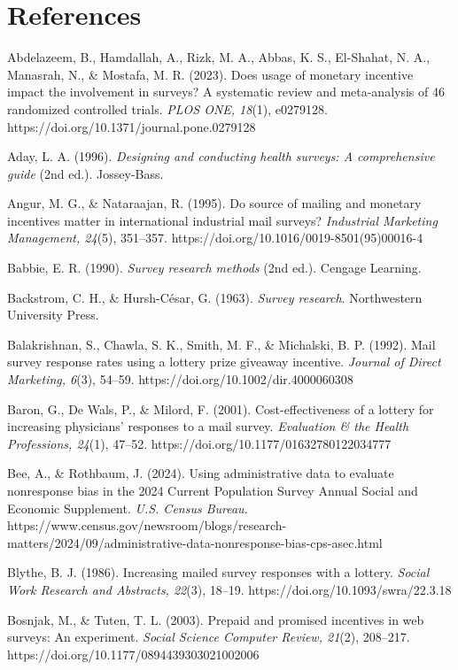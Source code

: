 \section*{References}

Abdelazeem, B., Hamdallah, A., Rizk, M. A., Abbas, K. S., El-Shahat, N. A., Manasrah, N., \& Mostafa, M. R. (2023). Does usage of monetary incentive impact the involvement in surveys? A systematic review and meta-analysis of 46 randomized controlled trials. \textit{PLOS ONE, 18}(1), e0279128. https://doi.org/10.1371/journal.pone.0279128

Aday, L. A. (1996). \textit{Designing and conducting health surveys: A comprehensive guide} (2nd ed.). Jossey-Bass.

Angur, M. G., \& Nataraajan, R. (1995). Do source of mailing and monetary incentives matter in international industrial mail surveys? \textit{Industrial Marketing Management, 24}(5), 351–357. https://doi.org/10.1016/0019-8501(95)00016-4

Babbie, E. R. (1990). \textit{Survey research methods} (2nd ed.). Cengage Learning.

Backstrom, C. H., \& Hursh-César, G. (1963). \textit{Survey research}. Northwestern University Press.

Balakrishnan, S., Chawla, S. K., Smith, M. F., \& Michalski, B. P. (1992). Mail survey response rates using a lottery prize giveaway incentive. \textit{Journal of Direct Marketing, 6}(3), 54–59. https://doi.org/10.1002/dir.4000060308

Baron, G., De Wals, P., \& Milord, F. (2001). Cost-effectiveness of a lottery for increasing physicians’ responses to a mail survey. \textit{Evaluation \& the Health Professions, 24}(1), 47–52. https://doi.org/10.1177/01632780122034777

Bee, A., \& Rothbaum, J. (2024). Using administrative data to evaluate nonresponse bias in the 2024 Current Population Survey Annual Social and Economic Supplement. \textit{U.S. Census Bureau}. https://www.census.gov/newsroom/blogs/research-matters/2024/09/administrative-data-nonresponse-bias-cps-asec.html

Blythe, B. J. (1986). Increasing mailed survey responses with a lottery. \textit{Social Work Research and Abstracts, 22}(3), 18–19. https://doi.org/10.1093/swra/22.3.18

Bosnjak, M., \& Tuten, T. L. (2003). Prepaid and promised incentives in web surveys: An experiment. \textit{Social Science Computer Review, 21}(2), 208–217. https://doi.org/10.1177/0894439303021002006


